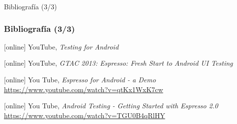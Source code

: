 \documentclass[pdf]
{beamer}
\begin{document}
    
    \begin{frame}{Bibliograf\'ia (3/3)}
      \frametitle<presentation>{Bibliograf\'ia (3/3)}    
      
      
      \begin{thebibliography}{10}    

    [online]
	  YouTube, {\em Testing for Android}

      [online]
	  YouTube, {\em GTAC 2013: Espresso: Fresh Start to Android UI Testing}
	  
      [online]
	  You Tube, {\em Espresso for Android - a Demo}
	  \newblock \href{https://www.youtube.com/watch?v=qtKx1WxK7cw}{https://www.youtube.com/watch?v=qtKx1WxK7cw}
	  
      [online]
	  You Tube, {\em Android Testing - Getting Started with Espresso 2.0}
	  \newblock \href{https://www.youtube.com/watch?v=TGU0B4qRlHY}{https://www.youtube.com/watch?v=TGU0B4qRlHY}

      \end{thebibliography}
      
    \end{frame}
    
\end{document}
